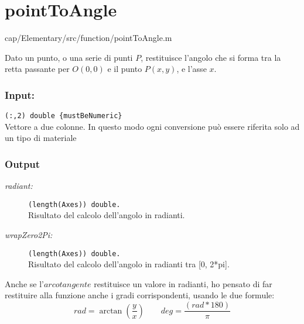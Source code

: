 \section{pointToAngle}\label{fnc:pointToAngle}


{cap/Elementary/src/function/pointToAngle.m}

Dato un punto, o una serie di punti $P$, restituisce l'angolo che 
si forma tra la retta passante per $O(0,0)$ e il punto $P(x,y)$, 
e l'asse $x$.


\subsubsection{Input:}
\begin{tcolorbox}
    \begin{description}
\setlength{\itemindent}{-.2in}
        
        \item[\textit{Axes:}] \verb|(:,2) double {mustBeNumeric}|\\
        Vettore a due colonne. In questo modo ogni conversione 
        può essere riferita solo ad un tipo di materiale
    \end{description}
\end{tcolorbox}

\subsubsection{Output}
\begin{tcolorbox}
    \begin{description}        
        \item[\textit{radiant:}] \verb|(length(Axes)) double.|\\
        Risultato del calcolo dell'angolo in radianti.
        
        \item[\textit{wrapZero2Pi:}] \verb|(length(Axes)) double.|\\
        Risultato del calcolo dell'angolo in radianti tra [0, 2*pi].
    \end{description}  
\end{tcolorbox}

{}

Anche se l'$arcotangente$ restituisce un valore in radianti, ho pensato di far 
restituire alla funzione anche i gradi corrispondenti, usando le due formule:
$$ rad = \arctan\left( \frac{y}{x} \right) \qquad
   deg = \frac{\left( rad*180\right) }{\pi}$$

